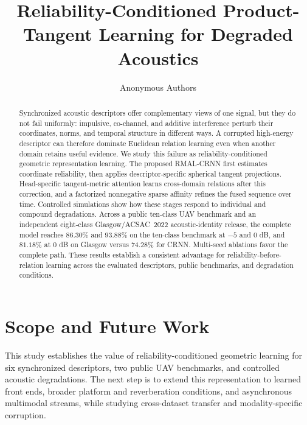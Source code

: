 \documentclass{article}
\title{Reliability-Conditioned Product-Tangent Learning for Degraded Acoustics}
\author{Anonymous Authors}
\begin{document}
\maketitle

\begin{abstract}
Synchronized acoustic descriptors offer complementary views of one signal, but they do not fail uniformly: impulsive, co-channel, and additive interference perturb their coordinates, norms, and temporal structure in different ways. A corrupted high-energy descriptor can therefore dominate Euclidean relation learning even when another domain retains useful evidence. We study this failure as reliability-conditioned geometric representation learning. The proposed RMAL-CRNN first estimates coordinate reliability, then applies descriptor-specific spherical tangent projections. Head-specific tangent-metric attention learns cross-domain relations after this correction, and a factorized nonnegative sparse affinity refines the fused sequence over time. Controlled simulations show how these stages respond to individual and compound degradations. Across a public ten-class UAV benchmark and an independent eight-class Glasgow/ACSAC~2022 acoustic-identity release, the complete model reaches $86.30\%$ and $93.88\%$ on the ten-class benchmark at $-5$ and $0$ dB, and $81.18\%$ at $0$ dB on Glasgow versus $74.28\%$ for CRNN. Multi-seed ablations favor the complete path. These results establish a consistent advantage for reliability-before-relation learning across the evaluated descriptors, public benchmarks, and degradation conditions.
\end{abstract}





\section{Scope and Future Work}
This study establishes the value of reliability-conditioned geometric learning for six synchronized descriptors, two public UAV benchmarks, and controlled acoustic degradations. The next step is to extend this representation to learned front ends, broader platform and reverberation conditions, and asynchronous multimodal streams, while studying cross-dataset transfer and modality-specific corruption.
\end{document}
